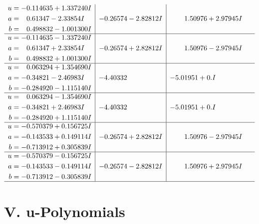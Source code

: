 \documentclass[1p]{elsarticle_modified}
\theoremstyle{definition}
\begin{document}
$$\begin{array}{c|c|c}
\begin{aligned}
u &= -0.114635 + 1.337240 I \\
a &= \phantom{-}0.61347 - 2.33854 I \\
b &= \phantom{-}0.498832 - 1.001300 I\end{aligned}
 & -0.26574 - 2.82812 I & \phantom{-}1.50976 + 2.97945 I \\ \hline\begin{aligned}
u &= -0.114635 - 1.337240 I \\
a &= \phantom{-}0.61347 + 2.33854 I \\
b &= \phantom{-}0.498832 + 1.001300 I\end{aligned}
 & -0.26574 + 2.82812 I & \phantom{-}1.50976 - 2.97945 I \\ \hline\begin{aligned}
u &= \phantom{-}0.063294 + 1.354690 I \\
a &= -0.34821 - 2.46983 I \\
b &= -0.284920 - 1.115140 I\end{aligned}
 & -4.40332\phantom{ +0.000000I} & -5.01951 + 0. I\phantom{ +0.000000I} \\ \hline\begin{aligned}
u &= \phantom{-}0.063294 - 1.354690 I \\
a &= -0.34821 + 2.46983 I \\
b &= -0.284920 + 1.115140 I\end{aligned}
 & -4.40332\phantom{ +0.000000I} & -5.01951 + 0. I\phantom{ +0.000000I} \\ \hline\begin{aligned}
u &= -0.570379 + 0.156725 I \\
a &= -0.143533 + 0.149114 I \\
b &= -0.713912 + 0.305839 I\end{aligned}
 & -0.26574 + 2.82812 I & \phantom{-}1.50976 - 2.97945 I \\ \hline\begin{aligned}
u &= -0.570379 - 0.156725 I \\
a &= -0.143533 - 0.149114 I \\
b &= -0.713912 - 0.305839 I\end{aligned}
 & -0.26574 - 2.82812 I & \phantom{-}1.50976 + 2.97945 I\\
 \hline 
 \end{array}$$\newpage
\newpage\renewcommand{\arraystretch}{1}
\centering \section*{ V. u-Polynomials}
\end{document}
